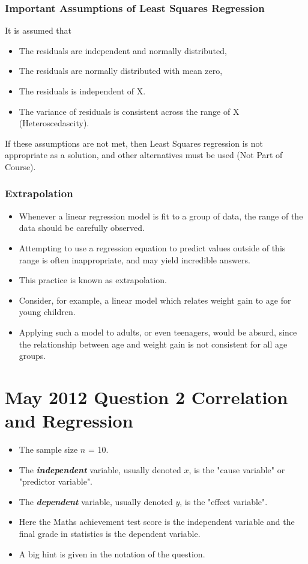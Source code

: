 \documentclass[]{report}
\begin{document}
\subsubsection{Important Assumptions of Least Squares Regression}
It is assumed that
\begin{itemize}
	\item The residuals are independent and normally distributed,
	\item The residuals are normally distributed with mean zero,
	\item The residuals is independent of X.
	\item The variance of residuals is consistent across the range of X (Heteroscedascity).
\end{itemize}
If these assumptions are not met, then Least Squares regression is not appropriate as a solution, and other alternatives must be used (Not Part of Course).

\subsubsection{Extrapolation}
\begin{itemize}
	\item
	Whenever a linear regression model is fit to a group of data, the range of the data should be carefully observed. \item  Attempting to use a regression equation to predict values outside of this range is often inappropriate, and may yield incredible answers. \item This practice is known as extrapolation. \item Consider, for example, a linear model which relates weight gain to age for young children. \item Applying such a model to adults, or even teenagers, would be absurd, since the relationship between age and weight gain is not consistent for all age groups.
\end{itemize}

			
			\section*{May 2012 Question 2 Correlation and Regression}
			\begin{itemize}
				\item The sample size $n$ = 10.
				\item The \textbf{\textit{independent}} variable, usually denoted $x$, is the "cause variable" or "predictor variable".
				\item The \textbf{\textit{dependent}} variable, usually denoted $y$, is the "effect variable".
				\item Here the Maths achievement test score is the independent variable and the final grade in statistics is the dependent variable.
				\item A big hint is given in the notation of the question.
			\end{itemize}
			
\end{document}
